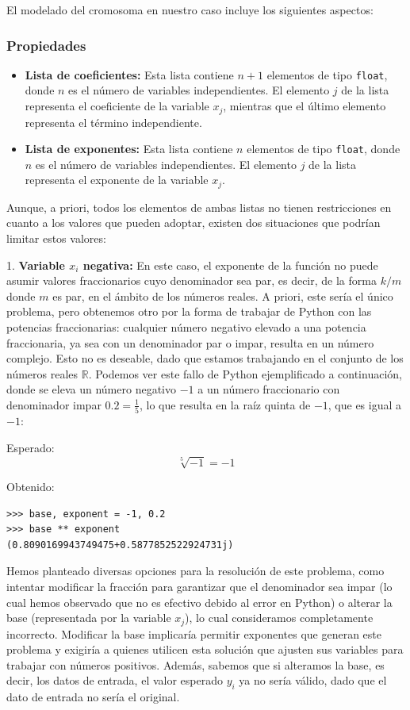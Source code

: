 \documentclass[conference,a4paper]{IEEEtran}
\begin{document}
El modelado del cromosoma en nuestro caso incluye los siguientes aspectos:

\subsubsection{Propiedades}
\begin{itemize}
    \item \textbf{Lista de coeficientes:} Esta lista contiene \( n + 1 \) elementos de tipo \texttt{float}, donde \( n \) es el número de variables independientes. El elemento \( j \) de la lista representa el coeficiente de la variable \( x_j \), mientras que el último elemento representa el término independiente.
    \item \textbf{Lista de exponentes:} Esta lista contiene \( n \) elementos de tipo \texttt{float}, donde \( n \) es el número de variables independientes. El elemento \( j \) de la lista representa el exponente de la variable \( x_j \).
\end{itemize}

Aunque, a priori, todos los elementos de ambas listas no tienen restricciones en cuanto a los valores que pueden adoptar, existen dos situaciones que podrían limitar estos valores:


1. \textbf{Variable \( x_i \) negativa:} En este caso, el exponente de la función no puede asumir valores fraccionarios cuyo denominador sea par, es decir, de la forma \( k/m \) donde \( m \) es par, en el ámbito de los números reales. A priori, este sería el único problema, pero obtenemos otro por la forma de trabajar de Python con las potencias fraccionarias: cualquier número negativo elevado a una potencia fraccionaria, ya sea con un denominador par o impar, resulta en un número complejo. Esto no es deseable, dado que estamos trabajando en el conjunto de los números reales \( \mathbb{R} \). Podemos ver este fallo de Python ejemplificado a continuación, donde se eleva un número negativo \( -1 \) a un número fraccionario con denominador impar \( 0.2 = \frac{1}{5} \), lo que resulta en la raíz quinta de \(-1\), que es igual a \(-1\):

Esperado:
\[
\sqrt[5]{-1} = -1
\]

Obtenido:
\begin{verbatim}
>>> base, exponent = -1, 0.2
>>> base ** exponent
(0.8090169943749475+0.5877852522924731j)
\end{verbatim}

Hemos planteado diversas opciones para la resolución de este problema, como intentar modificar la fracción para garantizar que el denominador sea impar (lo cual hemos observado que no es efectivo debido al error en Python) o alterar la base (representada por la variable \(x_j\)), lo cual consideramos completamente incorrecto. Modificar la base implicaría permitir exponentes que generan este problema y exigiría a quienes utilicen esta solución que ajusten sus variables para trabajar con números positivos. Además, sabemos que si alteramos la base, es decir, los datos de entrada, el valor esperado \(y_i\) ya no sería válido, dado que el dato de entrada no sería el original. 
\end{document}
